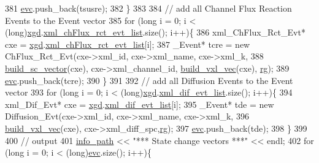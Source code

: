 \begin{DoxyCode}
381         \hyperlink{classnw_1_1_standard___ipt_aed79f0ae61a44f1d3aceb6839a8a7733}{evc}.push\_back(tsusre);
382     \}
383 
384 \textcolor{comment}{//  add all Channel Flux Reaction Events to the Event vector}
385     \textcolor{keywordflow}{for} (\textcolor{keywordtype}{long} i = 0; i < (long)\hyperlink{classnw_1_1_standard___ipt_aad5708d9729b7a5f660dade1927b4d4e}{xgd}.\hyperlink{structnw_1_1_standard___ipt_1_1xml__gen__data_ae0479559e90fe38932ac604852a1541f}{xml\_chFlux\_rct\_evt\_list}.size(); i++)\{
386         xml\_ChFlux\_Rct\_Evt* cxe = \hyperlink{classnw_1_1_standard___ipt_aad5708d9729b7a5f660dade1927b4d4e}{xgd}.\hyperlink{structnw_1_1_standard___ipt_1_1xml__gen__data_ae0479559e90fe38932ac604852a1541f}{xml\_chFlux\_rct\_evt\_list}[i];
387         \_Event* tcre =  \textcolor{keyword}{new} ChFlux\_Rct\_Evt(cxe->xml\_id, cxe->xml\_name, cxe->xml\_k,
388                         \hyperlink{classnw_1_1_standard___ipt_a5623430707739fdabf4d99599e6444a2}{build\_sc\_vector}(cxe), cxe->xml\_channel\_id, 
      \hyperlink{classnw_1_1_standard___ipt_a834bc59d1c945553aad59de7b23e019f}{build\_vxl\_vec}(cxe), \hyperlink{classnw_1_1_standard___ipt_a18f5e3cad0d5eef81443dfaf8949ba4b}{rg});
389         \hyperlink{classnw_1_1_standard___ipt_aed79f0ae61a44f1d3aceb6839a8a7733}{evc}.push\_back(tcre);
390     \}
391 
392 \textcolor{comment}{//  add all Diffusion Events to the Event vector}
393     \textcolor{keywordflow}{for} (\textcolor{keywordtype}{long} i = 0; i < (long)\hyperlink{classnw_1_1_standard___ipt_aad5708d9729b7a5f660dade1927b4d4e}{xgd}.\hyperlink{structnw_1_1_standard___ipt_1_1xml__gen__data_a115f67778a3d29d716303c194354d2f7}{xml\_dif\_evt\_list}.size(); i++)\{
394         xml\_Dif\_Evt* cxe = \hyperlink{classnw_1_1_standard___ipt_aad5708d9729b7a5f660dade1927b4d4e}{xgd}.\hyperlink{structnw_1_1_standard___ipt_1_1xml__gen__data_a115f67778a3d29d716303c194354d2f7}{xml\_dif\_evt\_list}[i];
395         \_Event* tde =   \textcolor{keyword}{new} Diffusion\_Evt(cxe->xml\_id, cxe->xml\_name, cxe->xml\_k,
396                         \hyperlink{classnw_1_1_standard___ipt_a834bc59d1c945553aad59de7b23e019f}{build\_vxl\_vec}(cxe), cxe->xml\_diff\_spc,\hyperlink{classnw_1_1_standard___ipt_a18f5e3cad0d5eef81443dfaf8949ba4b}{rg});
397         \hyperlink{classnw_1_1_standard___ipt_aed79f0ae61a44f1d3aceb6839a8a7733}{evc}.push\_back(tde);
398     \}
399 
400 \textcolor{comment}{//  output}
401     \hyperlink{classnw_1_1_standard___ipt_a7b8147e8b90f4adabb30e1b3fd8c40b8}{info\_path} << \textcolor{stringliteral}{"*** State change vectors ***"} << endl;
402     \textcolor{keywordflow}{for} (\textcolor{keywordtype}{long} i = 0; i < (long)\hyperlink{classnw_1_1_standard___ipt_aed79f0ae61a44f1d3aceb6839a8a7733}{evc}.size(); i++)\{

\end{DoxyCode}
